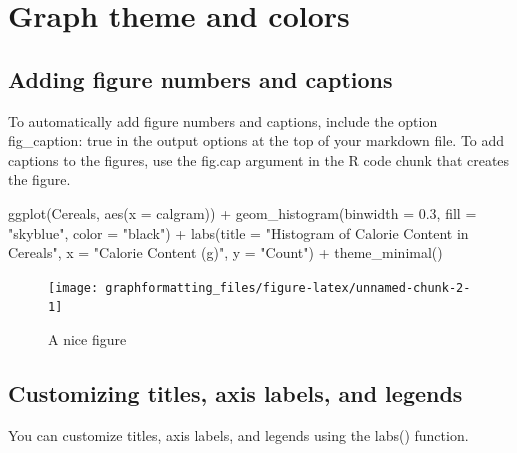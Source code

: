 \documentclass[
]{book}
\newenvironment{Shaded}{\begin{snugshade}}{\end{snugshade}}
\newcommand{\AttributeTok}[1]{\textcolor[rgb]{0.77,0.63,0.00}{#1}}
\newcommand{\FloatTok}[1]{\textcolor[rgb]{0.00,0.00,0.81}{#1}}
\newcommand{\FunctionTok}[1]{\textcolor[rgb]{0.00,0.00,0.00}{#1}}
\newcommand{\NormalTok}[1]{#1}
\newcommand{\SpecialCharTok}[1]{\textcolor[rgb]{0.00,0.00,0.00}{#1}}
\newcommand{\StringTok}[1]{\textcolor[rgb]{0.31,0.60,0.02}{#1}}
\begin{document}
\hypertarget{graph-theme-and-colors}{%
\section{Graph theme and colors}\label{graph-theme-and-colors}}

\hypertarget{adding-figure-numbers-and-captions}{%
\subsection{Adding figure numbers and captions}\label{adding-figure-numbers-and-captions}}

To automatically add figure numbers and captions, include the option fig\_caption: true in the output options at the top of your markdown file. To add captions to the figures, use the fig.cap argument in the R code chunk that creates the figure.

\begin{Shaded}
\begin{Highlighting}[]
\FunctionTok{ggplot}\NormalTok{(Cereals, }\FunctionTok{aes}\NormalTok{(}\AttributeTok{x =}\NormalTok{ calgram)) }\SpecialCharTok{+}
  \FunctionTok{geom\_histogram}\NormalTok{(}\AttributeTok{binwidth =} \FloatTok{0.3}\NormalTok{, }\AttributeTok{fill =} \StringTok{"skyblue"}\NormalTok{, }\AttributeTok{color =} \StringTok{"black"}\NormalTok{) }\SpecialCharTok{+}
  \FunctionTok{labs}\NormalTok{(}\AttributeTok{title =} \StringTok{"Histogram of Calorie Content in Cereals"}\NormalTok{,}
       \AttributeTok{x =} \StringTok{"Calorie Content (g)"}\NormalTok{,}
       \AttributeTok{y =} \StringTok{"Count"}\NormalTok{) }\SpecialCharTok{+}
  \FunctionTok{theme\_minimal}\NormalTok{()}
\end{Highlighting}
\end{Shaded}

\begin{figure}
\texttt{[image: graphformatting\_files/figure-latex/unnamed-chunk-2-1]} \caption{A nice figure}\label{fig:unnamed-chunk-2}
\end{figure}

\hypertarget{customizing-titles-axis-labels-and-legends}{%
\subsection{Customizing titles, axis labels, and legends}\label{customizing-titles-axis-labels-and-legends}}

You can customize titles, axis labels, and legends using the labs() function.
\end{document}

